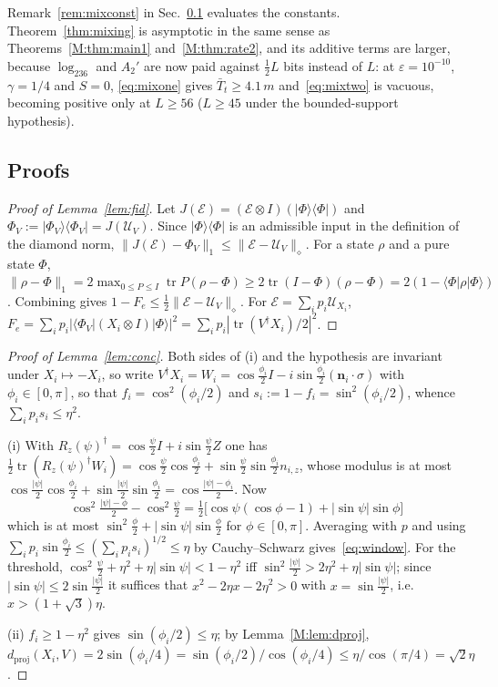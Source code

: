 \documentclass[aps,prx,twocolumn,superscriptaddress,nofootinbib,longbibliography]{revtex4-2}
\theoremstyle{plain}
\theoremstyle{definition}
\theoremstyle{remark}
\newcommand{\dproj}{d_{\mathrm{proj}}}
\newcommand{\tr}{\operatorname{tr}}
\begin{document}
Remark~\ref{rem:mixconst} in Sec.~\ref{app:mixing} evaluates the constants. Theorem~\ref{thm:mixing} is asymptotic in the same sense as Theorems~\ref{M:thm:main1} and~\ref{M:thm:rate2}, and its additive terms are larger, because $\log_236$ and $A_2'$ are now paid against $\tfrac12L$ bits instead of $L$: at $\varepsilon=10^{-10}$, $\gamma=1/4$ and $S=0$, \eqref{eq:mixone} gives $\bar T_t\ge4.1\,m$ and~\eqref{eq:mixtwo} is vacuous, becoming positive only at $L\ge56$ ($L\ge45$ under the bounded-support hypothesis).

\subsection{Proofs}\label{app:mixing}


\begin{proof}[Proof of Lemma~\ref{lem:fid}]
Let $J(\mathcal E)=(\mathcal E\otimes I)(|\Phi\rangle\langle\Phi|)$ and $\Phi_V:=|\Phi_V\rangle\langle\Phi_V|=J(\mathcal U_V)$. Since $|\Phi\rangle\langle\Phi|$ is an admissible input in the definition of the diamond norm, $\|J(\mathcal E)-\Phi_V\|_1\le\|\mathcal E-\mathcal U_V\|_\diamond$. For a state $\rho$ and a pure state $\Phi$, $\|\rho-\Phi\|_1=2\max_{0\le P\le I}\tr P(\rho-\Phi)\ge2\tr(I-\Phi)(\rho-\Phi)=2(1-\langle\Phi|\rho|\Phi\rangle)$. Combining gives $1-F_e\le\tfrac12\|\mathcal E-\mathcal U_V\|_\diamond$. For $\mathcal E=\sum_ip_i\mathcal U_{X_i}$, $F_e=\sum_ip_i|\langle\Phi_V|(X_i\otimes I)|\Phi\rangle|^2=\sum_ip_i|\tr(V^\dagger X_i)/2|^2$.
\end{proof}

\begin{proof}[Proof of Lemma~\ref{lem:conc}]
Both sides of (i) and the hypothesis are invariant under $X_i\mapsto-X_i$, so write $V^\dagger X_i=W_i=\cos\tfrac{\phi_i}2I-i\sin\tfrac{\phi_i}2(\mathbf n_i\!\cdot\!\sigma)$ with $\phi_i\in[0,\pi]$, so that $f_i=\cos^2(\phi_i/2)$ and $s_i:=1-f_i=\sin^2(\phi_i/2)$, whence $\sum_ip_is_i\le\eta^2$.

(i) With $R_z(\psi)^\dagger=\cos\tfrac\psi2I+i\sin\tfrac\psi2Z$ one has $\tfrac12\tr(R_z(\psi)^\dagger W_i)=\cos\tfrac\psi2\cos\tfrac{\phi_i}2+\sin\tfrac\psi2\sin\tfrac{\phi_i}2n_{i,z}$, whose modulus is at most $\cos\tfrac{|\psi|}2\cos\tfrac{\phi_i}2+\sin\tfrac{|\psi|}2\sin\tfrac{\phi_i}2=\cos\tfrac{|\psi|-\phi_i}2$. Now
\[
\cos^2\tfrac{|\psi|-\phi}2-\cos^2\tfrac\psi2=\tfrac12\big[\cos\psi(\cos\phi-1)+|\sin\psi|\sin\phi\big]
\]
which is at most $\sin^2\tfrac\phi2+|\sin\psi|\sin\tfrac\phi2$ for $\phi\in[0,\pi]$. Averaging with $p$ and using $\sum_ip_i\sin\tfrac{\phi_i}2\le(\sum_ip_is_i)^{1/2}\le\eta$ by Cauchy--Schwarz gives~\eqref{eq:window}. For the threshold, $\cos^2\tfrac\psi2+\eta^2+\eta|\sin\psi|<1-\eta^2$ iff $\sin^2\tfrac{|\psi|}2>2\eta^2+\eta|\sin\psi|$; since $|\sin\psi|\le2\sin\tfrac{|\psi|}2$ it suffices that $x^2-2\eta x-2\eta^2>0$ with $x=\sin\tfrac{|\psi|}2$, i.e.\ $x>(1+\sqrt3)\eta$.

(ii) $f_i\ge1-\eta^2$ gives $\sin(\phi_i/2)\le\eta$; by Lemma~\ref{M:lem:dproj}, $\dproj(X_i,V)=2\sin(\phi_i/4)=\sin(\phi_i/2)/\cos(\phi_i/4)\le\eta/\cos(\pi/4)=\sqrt2\eta$.
\end{proof}
\end{document}
